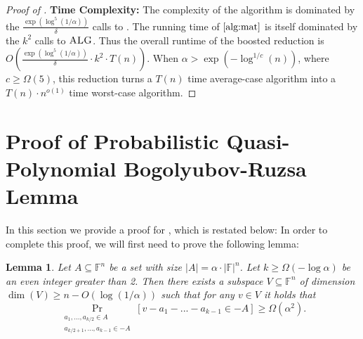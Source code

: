 \documentclass[12pt]{caltech_thesis}
\def\F{\mathbb{F}}
\newtheorem{lemma}{Lemma}
\begin{document}
\begin{proof}[Proof of ]
\hfill\newline
\textbf{Time Complexity:} The complexity of the algorithm is dominated by the $\frac{\exp(\log^5(1/\alpha))}{\delta}$ calls to . The running time of  $\Cref{alg:mat}$ is itself dominated by the $k^2$ calls to $\textsc{ALG}$. Thus the overall runtime of the boosted reduction is $O\left(\frac{\exp(\log^5(1/\alpha))}{\delta}\cdot k^2\cdot T(n) \right)$. When $\alpha > \exp(-\log^{1/c}(n))$, where $c \geq \Omega(5)$, this reduction turns a $T(n)$ time average-case algorithm into a $T(n)\cdot n^{o(1)}$ time worst-case algorithm.
    
\end{proof}






\section{Proof of Probabilistic Quasi-Polynomial Bogolyubov-Ruzsa Lemma}
\label{sec:proof-qpbr}

In this section we provide a proof for , which is restated below:
\lemqpbr*
In order to complete this proof, we will first need to prove the following lemma:
\begin{lemma}
\label{lem:large-subspace}
    Let $A\subseteq \F^n$ be a set with size $|A| = \alpha \cdot |\F|^n$.
    Let $k \geq \Omega(- \log \alpha)$ be an even integer greater than 2.
    Then there exists a subspace $V \subseteq \F^n$ of dimension $\dim(V) \geq n - O(\log(1/\alpha))$ such that for any $v \in V$ it holds that
    \begin{equation}
        \Pr_{\substack{a_1, ..., a_{k/2} \in A\\ a_{k/2 + 1},...,a_{k-1}\in -A}} \left[ v - a_1 - ... - a_{k-1} \in -A \right] \geq \Omega(\alpha^2).
    \end{equation}
\end{lemma}
\end{document}
